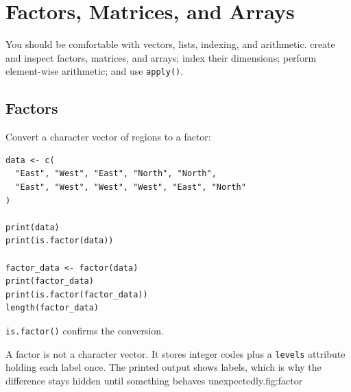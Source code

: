 \chapter{Factors, Matrices, and Arrays}
\label{chap:factors-matrices-arrays}

\chapterguide
  {You should be comfortable with vectors, lists, indexing, and arithmetic.}
  {create and inspect factors, matrices, and arrays; index their dimensions; perform element-wise arithmetic; and use \texttt{apply()}.}

\section{Factors}

Convert a character vector of regions to a factor:

\begin{lstlisting}[style=dsr]
data <- c(
  "East", "West", "East", "North", "North",
  "East", "West", "West", "West", "East", "North"
)

print(data)
print(is.factor(data))

factor_data <- factor(data)
print(factor_data)
print(is.factor(factor_data))
length(factor_data)
\end{lstlisting}

\texttt{is.factor()} confirms the conversion.

\begin{utpfig}{A factor is not a character vector. It stores
integer codes plus a \texttt{levels} attribute holding each label once. The
printed output shows labels, which is why the difference stays hidden until
something behaves unexpectedly.}{fig:factor}
\end{utpfig}

